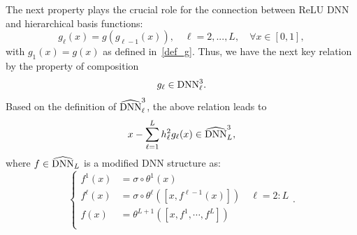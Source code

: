 The next property plays the crucial role for the connection between ReLU DNN and hierarchical basis functions:
\begin{equation}\label{func:glinduction}
g_\ell(x)=g(g_{\ell-1}(x)),\quad \ell=2,...,L, \quad \forall x \in [0,1],
\end{equation}
with $g_1(x) = g(x)$ as defined in~\ref{def_g}. Thus, we have the next key relation by the  property of composition
\begin{equation}\label{key}
g_\ell \in {\rm DNN}_\ell^{3}.
\end{equation}
Based on the definition of $\widehat{{\rm DNN}}_{\ell}^{3}$, the above relation leads to 
\begin{equation}\label{key}
x -\sum_{\ell=1}^L h^2_\ell g_\ell(x) \in \widehat{{\rm DNN}}_{L}^{3},
\end{equation}
where $f \in \widehat{{\rm DNN}}_{L}$ is a modified DNN structure as:
\begin{equation}\label{def:ReLUDNN2}
\begin{cases}
f^{1}(x) &= \sigma \circ \theta^1 (x) \\
f^{\ell}(x) &= \sigma \circ  \theta^{\ell} ([x, f^{\ell-1}(x)]) \quad \ell = 2:L \\
f(x) &= \theta^{L+1}( [x, f^1, \cdots, f^L] ) \\
\end{cases}.
\end{equation}


